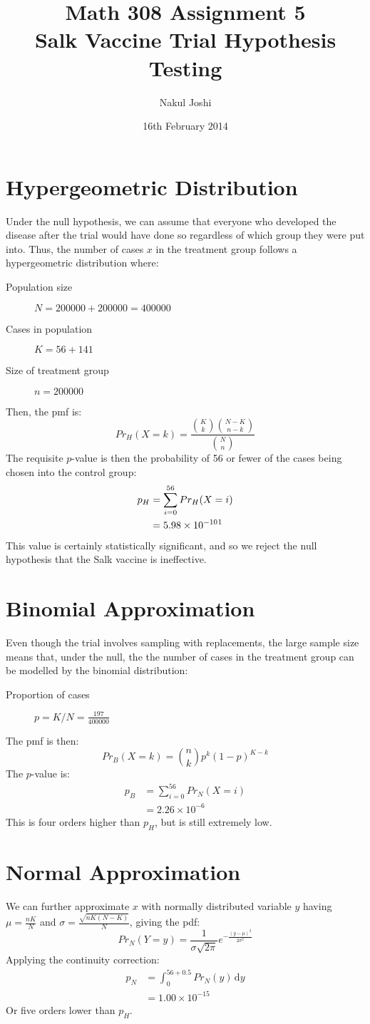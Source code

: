 \documentclass[twocolumn]{article}
\title{Math 308 Assignment 5\\Salk Vaccine Trial Hypothesis Testing}
\author{Nakul Joshi}
\date{16th February 2014}
\newcommand{\intg}[4]{\int_{#1}^{#2} \! #3 \, \mathrm{d}#4}
\begin{document}
\maketitle
\thispagestyle{empty}
\pagestyle{empty}
\section{Hypergeometric Distribution}
Under the null hypothesis, we can assume that everyone who developed the disease after the trial would have done so regardless of which group they were put into. Thus, the number of cases $x$ in the treatment group follows a hypergeometric distribution where:\begin{description}
\item[Population size] $N=200000+200000=400000$
\item[Cases in population] $K=56+141$
\item[Size of treatment group] $n=200000$
\end{description}
Then, the pmf is:\[
Pr_{H}(X=k)=\frac{\binom{K}{k}\binom{N-K}{n-k}}{\binom{N}{n}}
\]
The requisite $p$-value is then the probability of 56 or fewer of the cases being chosen into the control group:\begin{align*}
p_H&=\sum_{i=0}^{56}Pr_H(X=i)\\
&=5.98\times 10^{-10} \text{\footnotemark}
\end{align*}
This value is certainly statistically significant, and so we reject the null hypothesis that the Salk vaccine is ineffective.

\section{Binomial Approximation}
Even though the trial involves sampling with replacements, the large sample size means that, under the null, the the number of cases in the treatment group can be modelled by the binomial distribution:\begin{description}
\item[Proportion of cases] $p=K/N=\frac{197}{400000}$
\end{description}
The pmf is then:\[
Pr_{B}(X=k)=\binom{n}{k}p^{k}(1-p)^{K-k}
\]
The $p$-value is:\begin{align*}
p_B&=\sum_{i=0}^{56}Pr_{N}(X=i)\\
&=2.26\times 10^{-6}
\end{align*}
This is four orders higher than $p_H$, but is still extremely low.

\section{Normal Approximation}
We can further approximate $x$ with normally distributed variable $y$ having $\mu=\frac{n K}{N}$ and $\sigma=\frac{\sqrt{n K (N-K)}}{N}$, giving the pdf:\[
Pr_N(Y=y)=\frac{1}{\sigma\sqrt{2\pi}}e^{-\frac{(y-\mu)^2}{2\sigma^2}}
\]
Applying the continuity correction:\begin{align*}
p_N&=\intg{0}{56+0.5}{Pr_N(y)}{y}\\
&=1.00\times10^{-15}
\end{align*}
Or five orders lower than $p_H$.
\end{document}
